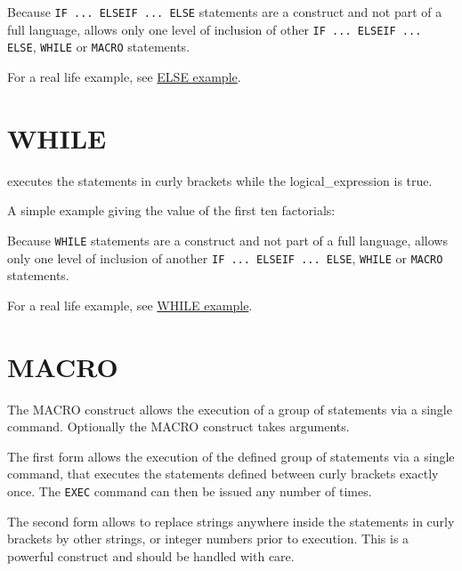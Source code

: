 Because \texttt{IF ... ELSEIF ... ELSE} statements are a \madx
construct and not part of a full language, \madx  allows only one level
of inclusion of other \texttt{IF ... ELSEIF ... ELSE}, \texttt{WHILE}
or \texttt{MACRO} statements.  

For a real life example, see \href{foot.html}{ELSE example}. 

\section{WHILE}
\label{sec:while}
executes the statements in curly brackets while the logical\_expression
is true. 

A simple example giving the value of the first ten factorials:

Because \texttt{WHILE} statements are a \madx
construct and not part of a full language, \madx  allows only one level
of inclusion of another \texttt{IF ... ELSEIF ... ELSE}, \texttt{WHILE}
or \texttt{MACRO} statements.  


For a real life example, see \href{foot.html}{WHILE example}.

\section{MACRO}
\label{sec:macro}

The MACRO construct allows the execution of a group of statements via a
single command. Optionally the MACRO construct takes arguments.


The first form allows the execution of the defined group of statements via a
single command,  
that executes the statements defined between curly brackets exactly
once. The \texttt{EXEC} command can then be issued any number of times.  

The second form allows to replace strings anywhere inside the statements
in curly brackets by other strings, or integer numbers prior to
execution. This is a powerful construct and should be handled with care.  

